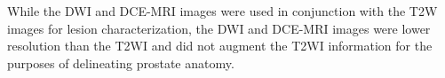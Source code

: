 While the DWI and DCE-MRI images were used in conjunction with the T2W images
for lesion characterization, the DWI and DCE-MRI images were lower resolution
than the T2WI and did not augment the T2WI information for the purposes of
delineating prostate anatomy.
